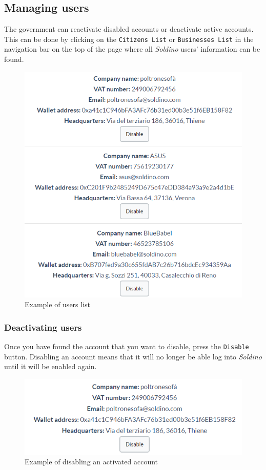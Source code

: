 	\subsection{Managing users}
	The government can reactivate disabled accounts or deactivate active 
	accounts. This can be done by clicking on the \texttt{Citizens List} or 
	\texttt{Businesses List} in the navigation bar on the top of the page 
	where all \textit{Soldino} users' information can be found.
	\begin{figure}[H]
		\includegraphics[width=13cm]{res/images/users_list.png}
		\centering
		\caption{Example of users list}
	\end{figure}
		\subsubsection{Deactivating users}
		Once you have found the account that you want to disable, press the 
		\texttt{Disable} button. Disabling an account means that it will no 
		longer be able log into \textit{Soldino} until it will be enabled again.
		\begin{figure}[H]
			\includegraphics[width=15cm]{res/images/user_disable.png}
			\centering
			\caption{Example of disabling an activated account}
		\end{figure}
